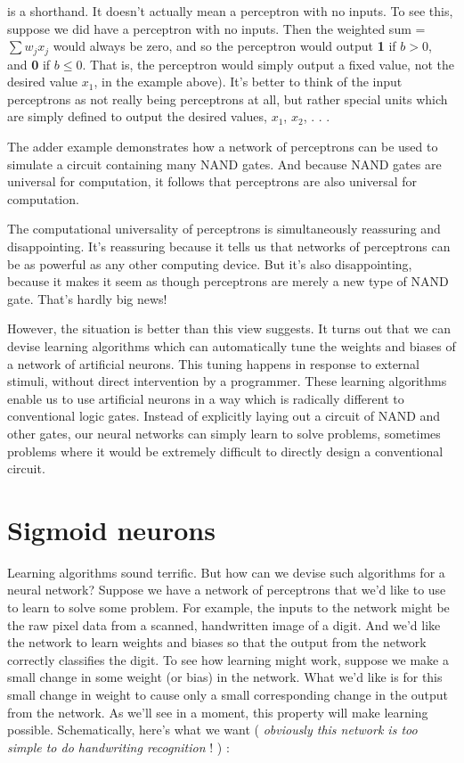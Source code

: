 \documentclass[a4paper,12pt]{report}%
\begin{document}
is a shorthand. It doesn't actually mean a perceptron with no inputs. To see this, suppose we did have a perceptron with no inputs. Then the weighted sum = $\sum w_{j} x_{j}$ would always be zero, and so the perceptron would output \textbf{1} if $b > 0$, and \textbf{0} if $b \le 0$. That is, the perceptron would simply output a fixed value, not the desired value $x_{1}$, in the example above). It's better to think of the input perceptrons as not really being perceptrons at all, but rather special units which are simply defined to output the desired values, $x_{1}$, $x_{2}$, . . .

The adder example demonstrates how a network of perceptrons can be used to simulate a circuit containing many NAND gates. And because NAND gates are universal for computation, it follows that perceptrons are also universal for computation.

The computational universality of perceptrons is simultaneously reassuring and disappointing. It's reassuring because it tells us that networks of perceptrons can be as powerful as any other computing device. But it's also disappointing, because it makes it seem as though perceptrons are merely a new type of NAND gate. That's hardly big news!

However, the situation is better than this view suggests. It turns out that we can devise learning algorithms which can automatically tune the weights and biases of a network of artificial neurons. This tuning happens in response to external stimuli, without direct intervention by a programmer. These learning algorithms enable us to use artificial neurons in a way which is radically different to conventional logic gates. Instead of explicitly laying out a circuit of NAND and other gates, our neural networks can simply learn to solve problems, sometimes problems where it would be extremely difficult to directly design a conventional circuit.


\section{Sigmoid neurons}

Learning algorithms sound terrific. But how can we devise such algorithms for a neural network? Suppose we have a network of perceptrons that we'd like to use to learn to solve some problem. For example, the inputs to the network might be the raw pixel data from a scanned, handwritten image of a digit. And we'd like the network to learn weights and biases so that the output from the network correctly classifies the digit. To see how learning might work, suppose we make a small change in some weight (or bias) in the network. What we'd like is for this small change in weight to cause only a small corresponding change in the output from the network. As we'll see in a moment, this property will make learning possible. Schematically, here's what we want ( {\it obviously this network is too simple to do handwriting recognition} ! ) :
\end{document}
